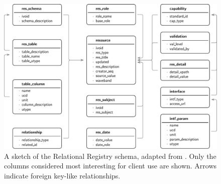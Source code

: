 \documentclass[11pt,a4paper]{ivoa}
\begin{document}
\begin{figure}

\includegraphics[width=\textwidth]{schema.pdf}
\caption{A sketch of the
Relational Registry schema, adapted from \citet{regtap-adass}.  
Only the columns considered
most interesting for client use are shown.  Arrows indicate foreign
key-like relationships.}
\end{figure}


\end{document}

